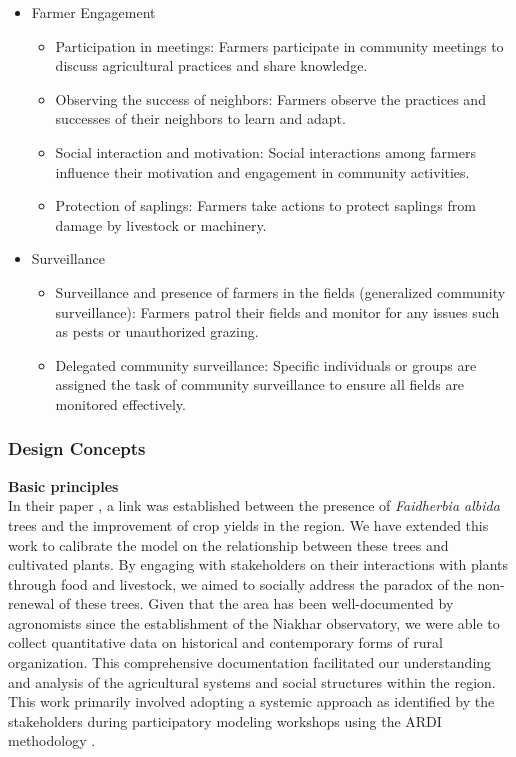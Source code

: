 \documentclass{article}
\begin{document}
\begin{itemize}
            \item Farmer Engagement
            \begin{itemize}
                \item Participation in meetings: Farmers participate in community meetings to discuss agricultural practices and share knowledge.
                \item Observing the success of neighbors: Farmers observe the practices and successes of their neighbors to learn and adapt.
                \item Social interaction and motivation: Social interactions among farmers influence their motivation and engagement in community activities.
                \item Protection of saplings: Farmers take actions to protect saplings from damage by livestock or machinery.
            \end{itemize}

            \item Surveillance
            \begin{itemize}
                \item Surveillance and presence of farmers in the fields (generalized community surveillance): Farmers patrol their fields and monitor for any issues such as pests or unauthorized grazing.
                \item Delegated community surveillance: Specific individuals or groups are assigned the task of community surveillance to ensure all fields are monitored effectively.
            \end{itemize}
        \end{itemize}


    \subsubsection{Design Concepts}

        \textbf{Basic principles}\\

        In their paper \parencite{roupsard_how_2020}, a link was established between the presence of \textit{Faidherbia albida} trees and the improvement of crop yields in the region. We have extended this work to calibrate the model on the relationship between these trees and cultivated plants. By engaging with stakeholders on their interactions with plants through food and livestock, we aimed to socially address the paradox of the non-renewal of these trees. Given that the area has been well-documented by agronomists since the establishment of the Niakhar observatory, we were able to collect quantitative data on historical \parencite{pieri_fertilite_1989, pelissier_paysans_1966} and contemporary \parencite{audouin_chapitre_2018, ba_impact_2018} forms of rural organization. This comprehensive documentation facilitated our understanding and analysis of the agricultural systems and social structures within the region. This work primarily involved adopting a systemic approach as identified by the stakeholders during participatory modeling workshops using the ARDI methodology \parencite{etienne_ardi_2011,etienne_companion_2014}.\\
\end{document}
